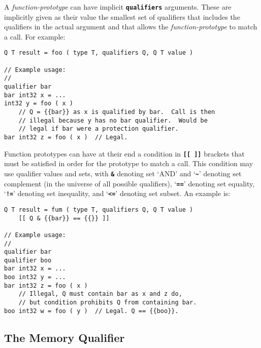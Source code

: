 \documentclass[12pt]{article}
\newcommand{\TT}[1]{{\tt \bfseries #1}}
\newenvironment{indpar}[1][0.3in]%
	{\begin{list}{}%
		     {\setlength{\itemsep}{0in}%
		      \setlength{\topsep}{0in}%
		      \setlength{\parsep}{1ex}%
		      \setlength{\labelwidth}{#1}%
		      \setlength{\leftmargin}{#1}%
		      \addtolength{\leftmargin}{\labelsep}}%
	 \item}%
	{\end{list}}
\begin{document}
A {\em function-prototype} can have implicit \TT{qualifiers} arguments.
These are implicitly given as their value the smallest set of qualifiers
that includes the qualifiers in the actual argument and that
allows the {\em function-prototype} to match a call.  For example:

\begin{indpar}\begin{verbatim}
Q T result = foo ( type T, qualifiers Q, Q T value )

// Example usage:
//
qualifier bar
bar int32 x = ...
int32 y = foo ( x )     
    // Q = {{bar}} as x is qualified by bar.  Call is then
    // illegal because y has no bar qualifier.  Would be
    // legal if bar were a protection qualifier.
bar int32 z = foo ( x )  // Legal.
\end{verbatim}\end{indpar}

Function prototypes can have at their end a condition in \TT{[[~]]}
brackets that must be satisfied in order for the prototype to match
a call.  This condition may use qualifier values and sets, with
\TT{\&} denoting set `AND' and `\TT{\textasciitilde}' denoting
set complement (in the universe of all possible qualifiers),
`\TT{==}' denoting set equality, `\TT{!=}' denoting set inequality,
and `\TT{<=}' denoting set subset.
An example is:

\begin{indpar}\begin{verbatim}
Q T result = fum ( type T, qualifiers Q, Q T value )
    [[ Q & {{bar}} == {{}} ]]

// Example usage:
//
qualifier bar
qualifier boo
bar int32 x = ...
boo int32 y = ...
bar int32 z = foo ( x )
    // Illegal, Q must contain bar as x and z do,
    // but condition prohibits Q from containing bar.
boo int32 w = foo ( y )  // Legal. Q == {{boo}}.
\end{verbatim}\end{indpar}

\subsection{The Memory Qualifier}
\label{THE-MEM-QUALIFIER}
\end{document}
